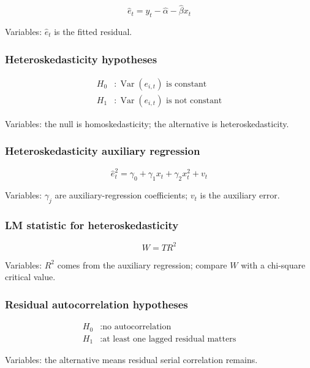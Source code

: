 \documentclass[
  8pt,
  twocolumn]{extarticle}
\begin{document}
\[
\hat e_t=y_t-\hat\alpha-\hat\beta x_t
\]

Variables: \(\hat e_t\) is the fitted residual.

\subsubsection{Heteroskedasticity
hypotheses}\label{heteroskedasticity-hypotheses}

\[
\begin{aligned}
H_0&:\operatorname{Var}(e_{i,t})\text{ is constant}\\
H_1&:\operatorname{Var}(e_{i,t})\text{ is not constant}
\end{aligned}
\]

Variables: the null is homoskedasticity; the alternative is
heteroskedasticity.

\subsubsection{Heteroskedasticity auxiliary
regression}\label{heteroskedasticity-auxiliary-regression}

\[
\hat e_t^2=\gamma_0+\gamma_1x_t+\gamma_2x_t^2+v_t
\]

Variables: \(\gamma_j\) are auxiliary-regression coefficients; \(v_t\)
is the auxiliary error.

\subsubsection{LM statistic for
heteroskedasticity}\label{lm-statistic-for-heteroskedasticity}

\[
W=TR^2
\]

Variables: \(R^2\) comes from the auxiliary regression; compare \(W\)
with a chi-square critical value.

\subsubsection{Residual autocorrelation
hypotheses}\label{residual-autocorrelation-hypotheses}

\[
\begin{aligned}
H_0&:\text{no autocorrelation}\\
H_1&:\text{at least one lagged residual matters}
\end{aligned}
\]

Variables: the alternative means residual serial correlation remains.
\end{document}
